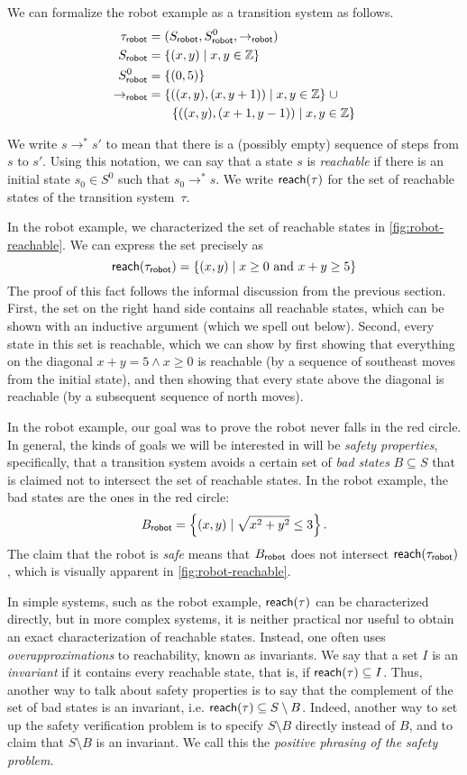 We can formalize the robot example as a transition system as follows.
\begin{align*}
  \tau_\robot &= (S_\robot, S^0_\robot, \to_\robot)\\
  S_\robot &= \set{(x,y) \mid x,y\in\Z}\\
  S^0_\robot &= \set{(0, 5)}\\
  \to_\robot &= \set{((x,y), (x, y + 1)) \mid x,y\in\Z} \mathrel{\cup}\\
            &\phantom{\mathrel{=}}\quad \set{((x,y), (x + 1, y - 1)) \mid x,y\in\Z}
\end{align*}

We write $s\to^* s'$ to mean that there is a (possibly empty) sequence of steps from $s$ to $s'$.
Using this notation, we can say that a state $s$ is \emph{reachable}
  if there is an initial state $s_0\in S^0$ such that $s_0 \to^* s$.
We write $\mathsf{reach}(\tau)$ for the set of reachable states of the transition system~$\tau$.

In the robot example,
  we characterized the set of reachable states in \cref{fig:robot-reachable}.
We can express the set precisely as
\[
  \mathsf{reach}(\tau_{\mathsf{robot}}) = \left\{{(x,y) \mid x \ge 0 \text{ and } x + y \ge 5}\right\}
\]
The proof of this fact follows the informal discussion from the previous section.
First, the set on the right hand side contains all reachable states,
  which can be shown with an inductive argument (which we spell out below).
Second, every state in this set is reachable,
  which we can show by
  first showing that everything on the diagonal $x + y = 5 \land x \ge 0$ is reachable
    (by a sequence of southeast moves from the initial state),
  and then showing that every state above the diagonal is reachable
    (by a subsequent sequence of north moves).

In the robot example, our goal was to prove the robot never falls in the red circle.
In general, the kinds of goals we will be interested in will be \emph{safety properties},
  specifically, that a transition system avoids a certain set of \emph{bad states} $B\subseteq S$
  that is claimed not to intersect the set of reachable states.
In the robot example, the bad states are the ones in the red circle:
\[
  B_{\mathsf{robot}} = \left\{{(x,y) \mid \sqrt{x^2 + y^2} \le 3}\right\}.
\]
The claim that the robot is \emph{safe} means that $B_{\mathsf{robot}}$ does not intersect $\mathsf{reach}(\tau_{\mathsf{robot}})$,
  which is visually apparent in \cref{fig:robot-reachable}.

In simple systems, such as the robot example,
  $\mathsf{reach}(\tau)$ can be characterized directly,
  but in more complex systems, it is neither practical nor useful
  to obtain an exact characterization of reachable states.
Instead, one often uses \emph{overapproximations} to reachability,
  known as invariants.
We say that a set $I$ is an \emph{invariant} if it contains every reachable state,
  that is, if $\mathsf{reach}(\tau) \subseteq I$.
Thus, another way to talk about safety properties is to say that
  the complement of the set of bad states is an invariant,
  i.e. $\mathsf{reach}(\tau) \subseteq S\setminus B$.
Indeed, another way to set up the safety verification problem is
  to specify $S\setminus B$ directly instead of $B$,
  and to claim that $S\setminus B$ is an invariant.
We call this the \emph{positive phrasing of the safety problem}.

